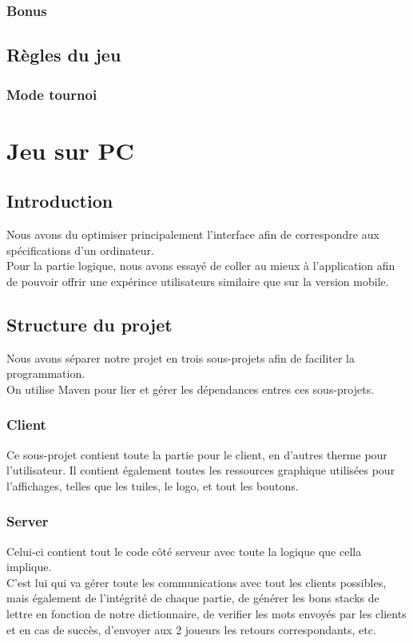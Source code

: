 \documentclass[a4paper,12pt]{article}
\begin{document}
			\subsubsection{Bonus}
		
		\subsection{Règles du jeu}
			\subsubsection{Mode tournoi}
	
	\section{Jeu sur PC}
	\subsection{Introduction}
	Nous avons du optimiser principalement l'interface afin de correspondre aux spécifications d'un ordinateur.\\
	Pour la partie logique, nous avons essayé de coller au mieux à l'application afin de pouvoir offrir une expérince utilisateurs similaire que sur la version mobile. 
	
	\subsection{Structure du projet}
	Nous avons 	séparer notre projet en trois sous-projets afin de faciliter la programmation.  \\
	On utilise Maven pour lier et gérer les dépendances entres ces sous-projets.
	
		\subsubsection{Client}
		Ce sous-projet contient toute la partie pour le client, en d'autres therme pour l'utilisateur. Il contient également toutes les ressources graphique utilisées pour l'affichages, telles que les tuiles, le logo, et tout les boutons.
		
		\subsubsection{Server}
		Celui-ci contient tout le code côté serveur avec toute la logique que cella implique. \\
		C'est lui qui va gérer toute les communications avec tout les clients possibles, mais également de l'intégrité de chaque partie, de générer les bons stacks de lettre en fonction de notre dictionnaire, de verifier les mots envoyés par les clients et en cas de succès, d'envoyer aux 2 joueurs les retours correspondants, etc.
		
\end{document}
